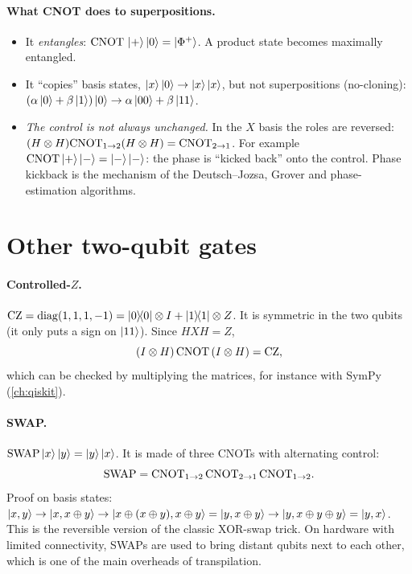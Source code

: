 \paragraph{What CNOT does to superpositions.}
\begin{itemize}
  \item It \emph{entangles}: $\mathrm{CNOT}\,\left|+\right\rangle\left|0\right\rangle=\left|\Phi^+\right\rangle$. A product state becomes maximally entangled.
  \item It ``copies'' basis states, $\left|x\right\rangle\left|0\right\rangle\to\left|x\right\rangle\left|x\right\rangle$, but not superpositions (no-cloning): $(\alpha\left|0\right\rangle+\beta\left|1\right\rangle)\left|0\right\rangle\to\alpha\left|00\right\rangle+\beta\left|11\right\rangle$.
  \item \emph{The control is not always unchanged.} In the $X$ basis the roles are reversed: $(H\otimes H)\mathrm{CNOT}_{1\to2}(H\otimes H)=\mathrm{CNOT}_{2\to1}$. For example
  $\mathrm{CNOT}\left|+\right\rangle\left|-\right\rangle=\left|-\right\rangle\left|-\right\rangle$: the phase is ``kicked back'' onto the control. Phase kickback is the mechanism of the Deutsch--Jozsa, Grover and phase-estimation algorithms.
\end{itemize}

\section{Other two-qubit gates}
\paragraph{Controlled-$Z$.} $\mathrm{CZ}=\operatorname{diag}(1,1,1,-1)=\left|0\middle\rangle\!\middle\langle0\right|\otimes I+\left|1\middle\rangle\!\middle\langle1\right|\otimes Z$. It is symmetric in the two qubits (it only puts a sign on $\left|11\right\rangle$). Since $HXH=Z$,
\begin{equation}
  (I\otimes H)\,\mathrm{CNOT}\,(I\otimes H)=\mathrm{CZ},
\end{equation}
which can be checked by multiplying the matrices, for instance with SymPy (\cref{ch:qiskit}).

\paragraph{SWAP.} $\mathrm{SWAP}\left|x\right\rangle\left|y\right\rangle=\left|y\right\rangle\left|x\right\rangle$. It is made of three CNOTs with alternating control:
\begin{equation}
  \mathrm{SWAP}=\mathrm{CNOT}_{1\to2}\,\mathrm{CNOT}_{2\to1}\,\mathrm{CNOT}_{1\to2}.
\end{equation}
Proof on basis states: $\left|x,y\right\rangle\to\left|x,x\oplus y\right\rangle\to\left|x\oplus(x\oplus y),x\oplus y\right\rangle=\left|y,x\oplus y\right\rangle\to\left|y,x\oplus y\oplus y\right\rangle=\left|y,x\right\rangle$. This is the reversible version of the
classic XOR-swap trick. On hardware with limited connectivity, SWAPs are used to bring distant qubits next to each other, which is one of the main overheads of transpilation.

